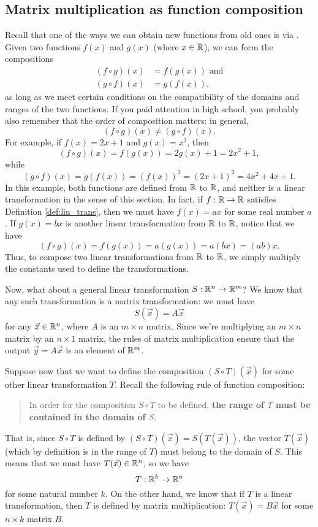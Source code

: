 \subsection*{Matrix multiplication as function composition}
Recall that one of the ways we can obtain new functions from old ones is via . Given two functions $f(x)$ and $g(x)$ (where $x\in\mathbb{R}$), we can form the compositions
\begin{align*}
(f\circ g)(x) &= f(g(x)) \text{ and}\\
(g\circ f)(x) & = g(f(x)),
\end{align*}
as long as we meet certain conditions on the compatibility of the domains and ranges of the two functions. If you paid attention in high school, you probably also remember that the order of composition matters: in general,
\[
(f\circ g)(x) \neq (g\circ f)(x).
\]
For example, if $f(x) = 2x+1$ and $g(x) = x^2$, then
\[
(f\circ g)(x) = f(g(x)) = 2g(x)+1 = 2x^2+1,
\]
while
\[
(g\circ f)(x) = g(f(x)) = (f(x))^2 = (2x+1)^2 = 4x^2+4x+1.
\]
In this example, both functions are defined from $\mathbb{R}$ to $\mathbb{R}$, and neither is a linear transformation in the sense of this section. In fact, if $f:\mathbb{R}\to\mathbb{R}$ satisfies Definition \ref{def:lin_trans}, then we must have $f(x) = ax$ for some real number $a$. If $g(x) = bx$ is another linear transformation from $\mathbb{R}$ to $\mathbb{R}$, notice that we have
\[
(f\circ g)(x) = f(g(x))=a(g(x)) = a(bx) = (ab)x.
\]
Thus, to compose two linear transformations from $\mathbb{R}$ to $\mathbb{R}$, we simply multiply the constants used to define the transformations.

Now, what about a general linear transformation $S:\mathbb{R}^n\to \mathbb{R}^m$? We know that any such transformation is a matrix transformation: we must have
\[
S(\vec x) = A\vec x
\]
for any $\vec x\in\mathbb{R}^n$, where $A$ is an $m\times n$ matrix. Since we're multiplying an $m\times n$ matrix by an $n\times 1$ matrix, the rules of matrix multiplication ensure that the output $\vec y = A\vec x$ is an element of $\mathbb{R}^m$.

Suppose now that we want to define the composition $(S\circ T)(\vec x)$ for some other linear transformation $T$. Recall the following rule of function composition:
\begin{quote}
In order for the composition $S\circ T$ to be defined, \textbf{the range of $T$ must be contained in the domain of $S$}.
\end{quote}
That is, since $S\circ T$ is defined by $(S\circ T)(\vec x) = S(T(\vec x))$, the vector $T(\vec x)$ (which by definition is in the range of $T$) must belong to the domain of $S$. This means that we must have $T(\vec x)\in \mathbb{R}^n$, so we have
\[
T:\mathbb{R}^k\to \mathbb{R}^n
\]
for some natural number $k$. On the other hand, we know that if $T$ is a linear transformation, then $T$ is defined by matrix multiplication: $T(\vec x) = B\vec x$ for some $n\times k$ matrix $B$.


